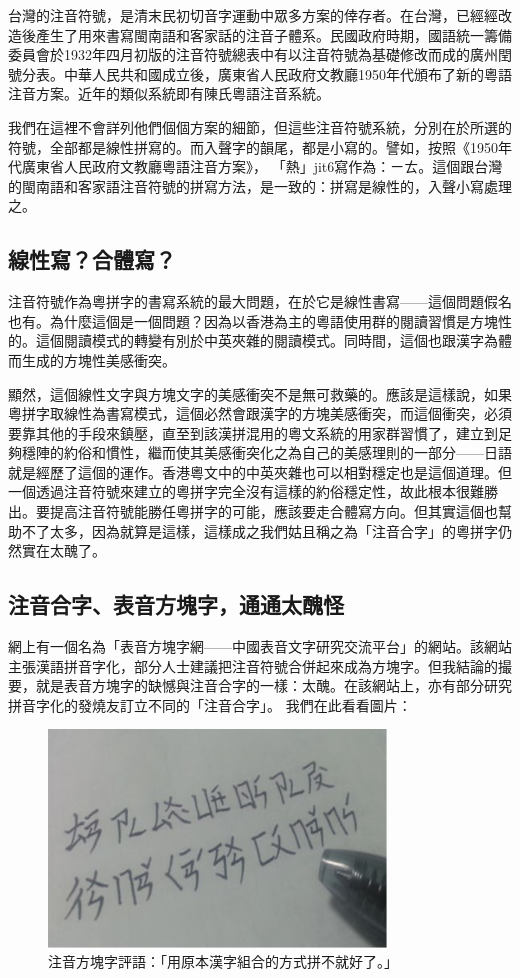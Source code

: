 \documentclass[a5paper, 10pt, openany]{book} %
\begin{document}
台灣的注音符號，是清末民初切音字運動中眾多方案的倖存者。在台灣，已經經改造後產生了用來書寫閩南語和客家話的注音子體系。民國政府時期，國語統一籌備委員會於1932年四月初版的注音符號總表中有以注音符號為基礎修改而成的廣州閏號分表。中華人民共和國成立後，廣東省人民政府文教廳1950年代頒布了新的粵語注音方案。近年的類似系統即有陳氏粵語注音系統。 

我們在這裡不會詳列他們個個方案的細節，但這些注音符號系統，分別在於所選的符號，全部都是線性拼寫的。而入聲字的韻尾，都是小寫的。譬如，按照《1950年代廣東省人民政府文教廳粵語注音方案》， 「熱」jit6寫作為：ㄧㄊ。這個跟台灣的閩南語和客家語注音符號的拼寫方法，是一致的：拼寫是線性的，入聲小寫處理之。

\subsection{線性寫？合體寫？}

注音符號作為粵拼字的書寫系統的最大問題，在於它是線性書寫——這個問題假名也有。為什麼這個是一個問題？因為以香港為主的粵語使用群的閱讀習慣是方塊性的。這個閱讀模式的轉變有別於中英夾雜的閱讀模式。同時間，這個也跟漢字為體而生成的方塊性美感衝突。

顯然，這個線性文字與方塊文字的美感衝突不是無可救藥的。應該是這樣說，如果粵拼字取線性為書寫模式，這個必然會跟漢字的方塊美感衝突，而這個衝突，必須要靠其他的手段來鎮壓，直至到該漢拼混用的粵文系統的用家群習慣了，建立到足夠穩陣的約俗和慣性，繼而使其美感衝突化之為自己的美感理則的一部分——日語就是經歷了這個的運作。香港粵文中的中英夾雜也可以相對穩定也是這個道理。但一個透過注音符號來建立的粵拼字完全沒有這樣的約俗穩定性，故此根本很難勝出。要提高注音符號能勝任粵拼字的可能，應該要走合體寫方向。但其實這個也幫助不了太多，因為就算是這樣，這樣成之我們姑且稱之為「注音合字」的粵拼字仍然實在太醜了。

\subsection{注音合字、表音方塊字，通通太醜怪}

網上有一個名為「表音方塊字網——中國表音文字研究交流平台」的網站。該網站主張漢語拼音字化，部分人士建議把注音符號合併起來成為方塊字。但我結論的撮要，就是表音方塊字的缺憾與注音合字的一樣：太醜。在該網站上，亦有部分研究拼音字化的發燒友訂立不同的「注音合字」。 我們在此看看圖片：

\begin{figure}[h]
  \centering
  \includegraphics[width=0.8\textwidth]{./images/zhuyin_composed_1.png}
  \caption{注音方塊字評語：「用原本漢字組合的方式拼不就好了。」}
\end{figure}
\end{document}
